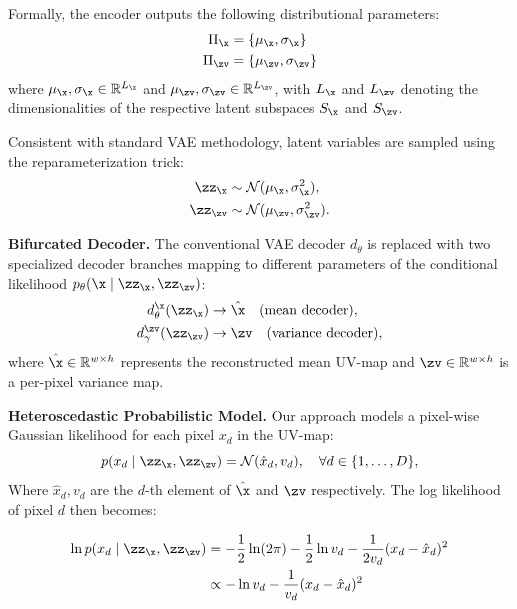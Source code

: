 Formally, the encoder outputs the following distributional parameters:
\begin{align}
  \Pi_{\x}  & = \{\mu_{\x}, \sigma_{\x}\}   \\
  \Pi_{\zv} & = \{\mu_{\zv}, \sigma_{\zv}\}
\end{align}
where $\mu_{\x},\sigma_{\x} \in \mathbb{R}^{L_{\x}}$ and $\mu_{\zv},\sigma_{\zv} \in \mathbb{R}^{L_{\zv}}$, with $L_{\x}$ and $L_{\zv}$ denoting the dimensionalities of the respective latent subspaces $S_{\x}$ and $S_{\zv}$.

Consistent with standard VAE methodology, latent variables are sampled using the reparameterization trick:
\begin{align}
  \zz_{\x}  & \sim \mathcal{N}(\mu_{\x}, \sigma_{\x}^2),   \\
  \zz_{\zv} & \sim \mathcal{N}(\mu_{\zv}, \sigma_{\zv}^2).
\end{align}

\textbf{Bifurcated Decoder.} The conventional VAE decoder $d_{\theta}$ is replaced with two specialized decoder branches mapping to different parameters of the conditional likelihood $p_{\theta}(\x \mid \zz_{\x}, \zz_{\zv})$:
\begin{align}
  d_{\theta}^{\x}(\zz_{\x})   & \rightarrow \hat{\x} \quad \text{(mean decoder)}, \\
  d_{\gamma}^{\zv}(\zz_{\zv}) & \rightarrow \zv \quad \text{(variance decoder)},
\end{align}
where $\hat{\x} \in \mathbb{R}^{w \times h}$ represents the reconstructed mean UV-map and $\zv \in \mathbb{R}^{w \times h}$ is a per-pixel variance map.

\textbf{Heteroscedastic Probabilistic Model.} Our approach models a pixel-wise Gaussian likelihood for each pixel $x_d$ in the UV-map:
\begin{equation}
  p(x_d \mid \zz_{\x}, \zz_{\zv}) = \mathcal{N}(\hat{x}_d, v_d), \quad \forall d \in \{1,\dots,D\},
\end{equation}
Where $\hat{x}_d, v_d$ are the $d$-th element of $\hat{\x}$ and $\zv$ respectively.
The log likelihood of pixel $d$ then becomes:

\begin{align}
  \ln p(x_d \mid \zz_{\x}, \zz_{\zv}) & =
  -\frac{1}{2} \ln(2 \pi) -\frac{1}{2} \ln{v_d} - \frac{1}{2v_d}(x_d - \hat{x}_d)^2           \\
                                      & \propto - \ln{v_d} - \frac{1}{v_d}(x_d - \hat{x}_d)^2
\end{align}

